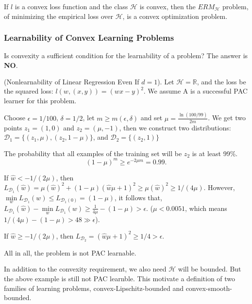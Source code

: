 \begin{lem}
	If $ l $ is a convex loss function and the class $ \mathcal{H} $ is convex, then the $ ERM_{\mathcal{H}} $ problem,
	of minimizing the empirical loss over $ \mathcal{H} $, is a convex optimization problem.
\end{lem}

\subsubsection{Learnability of Convex Learning Problems}

Is convexity a sufficient condition for the learnability of a problem?
The answer is \textbf{NO}.

\begin{exm}
	(Nonlearnability of Linear Regression Even If $ d=1 $).
	Let $ \mathcal{H} = \mathbb{R} $,
	and the loss be the squared loss: $ l(w,(x,y))={(wx-y)}^2 $.
	We assume A is a successful PAC learner for this problem.

	Choose $ \epsilon = 1/100 $, $ \delta = 1/2 $, let $ m \ge m(\epsilon, \delta) $ and set $ \mu = \frac{\ln(100/99)}{2m} $.
	We get two points $ z_1 = (1,0) $ and $ z_2 = (\mu, -1) $, then we construct two distributions:
	$ \mathcal{D}_1 = \{ (z_1, \mu), (z_2, 1-\mu) \} $, and $ \mathcal{D}_2 = \{ (z_2, 1) \} $

	The probability that all examples of the training set will be $ z_2 $ is at least 99\%.
	\[ {(1-\mu)}^m \ge e^{-2\mu m}=0.99.\]

	If $ \hat{w} < -1/(2\mu) $, then $ L_{\mathcal{D}_1} (\hat{w}) = \mu {(\hat{w})}^2 + (1-\mu){(\hat{w}\mu+1)}^2
	\ge \mu {(\hat{w})}^2 \ge 1/(4\mu)$. However, $ \min\limits_w L_{\mathcal{D}_1}(w) \le L_{\mathcal{D_1}(0)} = (1-\mu) $,
	it follows that, 
	$ L_{\mathcal{D_1}}(\hat{w}) - \min\limits_w L_{\mathcal{D}_1}(w) \ge \frac{1}{4\mu}-(1-\mu) > \epsilon $.
	($ \mu < 0.0051 $, which means $ 1/(4\mu) - (1-\mu) > 48 \gg \epsilon $).

	If $ \hat{w} \ge -1/(2\mu) $, then $ L_{\mathcal{D}_2} = {(\hat{w} \mu + 1)}^2 \ge 1/4 > \epsilon $.
	
	All in all, the problem is not PAC learnable.
\end{exm}

In addition to the convexity requirement, we also need $ \mathcal{H} $ will be bounded.
But the above example is still not PAC learnble.
This motivate a definition of two families of learning problems, convex-Lipschitz-bounded and convex-smooth-bounded.

